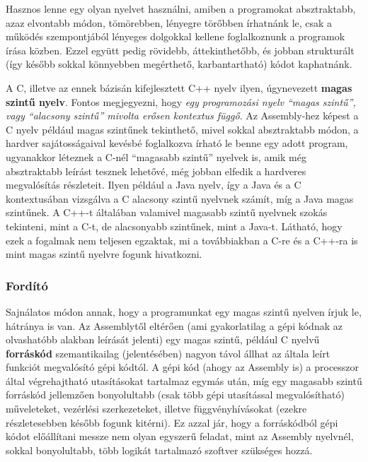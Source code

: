 Hasznos lenne egy olyan nyelvet használni, amiben a programokat absztraktabb, azaz elvontabb módon, tömörebben, lényegre törőbben írhatnánk le, csak a működés szempontjából lényeges dolgokkal kellene foglalkoznunk a programok írása közben. Ezzel együtt pedig rövidebb, áttekinthetőbb, és jobban strukturált (így később sokkal könnyebben megérthető, karbantartható) kódot kaphatnánk. 

A C, illetve az ennek bázisán kifejlesztett C++ nyelv ilyen, úgynevezett \textbf{magas szintű nyelv}.
Fontos megjegyezni, hogy \emph{egy programozási nyelv ``magas szintű'', vagy ``alacsony szintű'' mivolta erősen kontextus függő}. Az Assembly-hez képest a C nyelv például magas szintűnek tekinthető, mivel sokkal absztraktabb módon, a hardver sajátosságaival kevésbé foglalkozva írható le benne egy adott program, ugyanakkor léteznek a C-nél ``magasabb szintű'' nyelvek is, amik még absztraktabb leírást tesznek lehetővé, még jobban elfedik a hardveres megvalósítás részleteit. Ilyen például a Java nyelv, így a Java és a C kontextusában vizsgálva a C alacsony szintű nyelvnek számít, míg a Java magas szintűnek. A C++-t általában valamivel magasabb szintű nyelvnek szokás tekinteni, mint a C-t, de alacsonyabb szintűnek, mint a Java-t. Látható, hogy ezek a fogalmak nem teljesen egzaktak, mi a továbbiakban a C-re és a C++-ra is mint magas szintű nyelvre fogunk hivatkozni.

\subsubsection{Fordító}
Sajnálatos módon annak, hogy a programunkat egy magas szintű nyelven írjuk le, hátránya is van. Az Assemblytől eltérően (ami gyakorlatilag a gépi kódnak az olvashatóbb alakban leírását jelenti) egy magas szintű, például C nyelvű \textbf{forráskód} szemantikailag (jelentésében) nagyon távol állhat az általa leírt funkciót megvalósító gépi kódtól. 
A gépi kód (ahogy az Assembly is) a processzor által végrehajtható utasításokat tartalmaz egymás után, míg egy magasabb szintű forráskód jellemzően bonyolultabb (csak több gépi utasítással megvalósítható) műveleteket, vezérlési szerkezeteket, illetve függvényhívásokat (ezekre részletesebben később fogunk kitérni).
Ez azzal jár, hogy a forráskódból gépi kódot előállítani messze nem olyan egyszerű feladat, mint az Assembly nyelvnél, sokkal bonyolultabb, több logikát tartalmazó szoftver szükséges hozzá.


